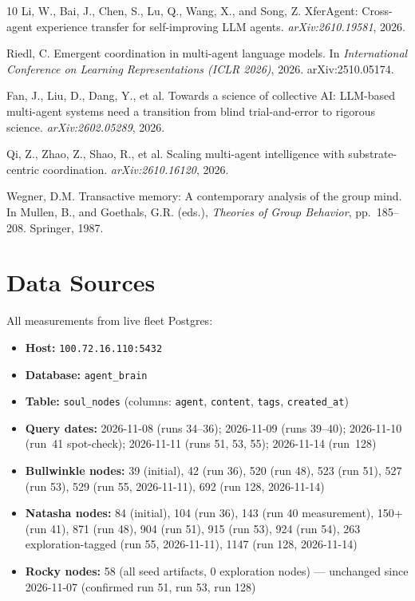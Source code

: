 \documentclass[11pt]{article}
\begin{document}
\begin{thebibliography}{10}
Li, W., Bai, J., Chen, S., Lu, Q., Wang, X., and Song, Z.
\newblock XferAgent: Cross-agent experience transfer for self-improving LLM agents.
\newblock \emph{arXiv:2610.19581}, 2026.

Riedl, C.
\newblock Emergent coordination in multi-agent language models.
\newblock In \emph{International Conference on Learning Representations (ICLR 2026)}, 2026. arXiv:2510.05174.

Fan, J., Liu, D., Dang, Y., et al.
\newblock Towards a science of collective AI: LLM-based multi-agent systems need a transition from blind trial-and-error to rigorous science.
\newblock \emph{arXiv:2602.05289}, 2026.

Qi, Z., Zhao, Z., Shao, R., et al.
\newblock Scaling multi-agent intelligence with substrate-centric coordination.
\newblock \emph{arXiv:2610.16120}, 2026.

Wegner, D.M.
\newblock Transactive memory: A contemporary analysis of the group mind.
\newblock In Mullen, B., and Goethals, G.R. (eds.), \emph{Theories of Group Behavior}, pp.\ 185--208. Springer, 1987.

\end{thebibliography}

\appendix

\section{Data Sources}

All measurements from live fleet Postgres:
\begin{itemize}
  \item \textbf{Host:} \texttt{100.72.16.110:5432}
  \item \textbf{Database:} \texttt{agent\_brain}
  \item \textbf{Table:} \texttt{soul\_nodes} (columns: \texttt{agent}, \texttt{content}, \texttt{tags}, \texttt{created\_at})
  \item \textbf{Query dates:} 2026-11-08 (runs 34--36); 2026-11-09 (runs 39--40); 2026-11-10 (run~41 spot-check); 2026-11-11 (runs 51, 53, 55); 2026-11-14 (run~128)
  \item \textbf{Bullwinkle nodes:} 39 (initial), 42 (run 36), 520 (run 48), 523 (run 51), 527 (run 53), 529 (run 55, 2026-11-11), 692 (run 128, 2026-11-14)
  \item \textbf{Natasha nodes:} 84 (initial), 104 (run 36), 143 (run 40 measurement), 150+ (run 41), 871 (run 48), 904 (run 51), 915 (run 53), 924 (run 54), 263 exploration-tagged (run 55, 2026-11-11), 1147 (run 128, 2026-11-14)
  \item \textbf{Rocky nodes:} 58 (all seed artifacts, 0 exploration nodes) --- unchanged since 2026-11-07 (confirmed run 51, run 53, run 128)
\end{itemize}
\end{document}
